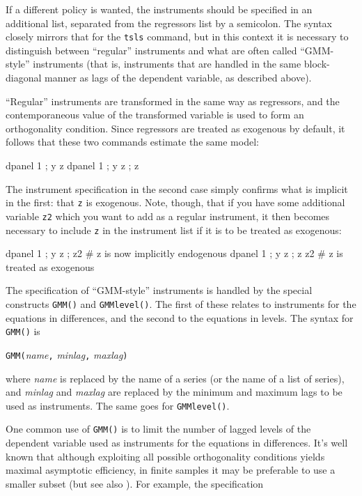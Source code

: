 If a different policy is wanted, the instruments should be specified
in an additional list, separated from the regressors list by a
semicolon. The syntax closely mirrors that for the \texttt{tsls}
command, but in this context it is necessary to distinguish between
``regular'' instruments and what are often called ``GMM-style''
instruments (that is, instruments that are handled in the same
block-diagonal manner as lags of the dependent variable, as described
above).

``Regular'' instruments are transformed in the same way as
regressors, and the contemporaneous value of the transformed variable
is used to form an orthogonality condition. Since regressors are
treated as exogenous by default, it follows that these two commands
estimate the same model:

\begin{code}
  dpanel 1 ; y z
  dpanel 1 ; y z ; z
\end{code}
The instrument specification in the second case simply confirms what
is implicit in the first: that \texttt{z} is exogenous. Note, though,
that if you have some additional variable \texttt{z2} which you want
to add as a regular instrument, it then becomes necessary to 
include \texttt{z} in the instrument list if it is to be treated
as exogenous:
\begin{code}
  dpanel 1 ; y z ; z2   # z is now implicitly endogenous
  dpanel 1 ; y z ; z z2 # z is treated as exogenous
\end{code}

The specification of ``GMM-style'' instruments is handled by the
special constructs \texttt{GMM()} and \texttt{GMMlevel()}.  The first
of these relates to instruments for the equations in differences, and
the second to the equations in levels. The syntax for \texttt{GMM()}
is

\begin{altcode}
\texttt{GMM(}\textsl{name}\texttt{,} \textsl{minlag}\texttt{,} 
\textsl{maxlag}\texttt{)}
\end{altcode}

\noindent
where \textsl{name} is replaced by the name of a series (or the name
of a list of series), and \textsl{minlag} and \textsl{maxlag} are
replaced by the minimum and maximum lags to be used as
instruments. The same goes for \texttt{GMMlevel()}.

One common use of \texttt{GMM()} is to limit the number of lagged
levels of the dependent variable used as instruments for the equations
in differences. It's well known that although exploiting all possible
orthogonality conditions yields maximal asymptotic efficiency, in
finite samples it may be preferable to use a smaller subset (but see
also \cite{OkuiJoE2009}).  For example, the specification

